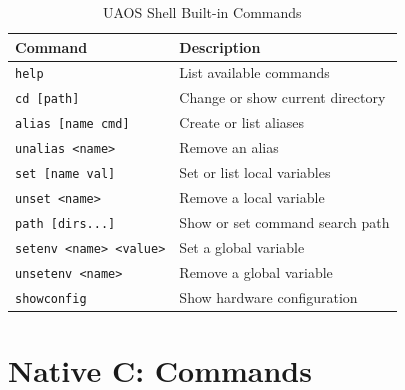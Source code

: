 \documentclass[11pt,a4paper]{report}
\begin{document}
\begin{table}[h]
    \centering
    \begin{tabular}{ll}
        \toprule
        \textbf{Command} & \textbf{Description} \\
        \midrule
        \texttt{help} & List available commands \\
        \texttt{cd [path]} & Change or show current directory \\
        \texttt{alias [name cmd]} & Create or list aliases \\
        \texttt{unalias <name>} & Remove an alias \\
        \texttt{set [name val]} & Set or list local variables \\
        \texttt{unset <name>} & Remove a local variable \\
        \texttt{path [dirs...]} & Show or set command search path \\
        \texttt{setenv <name> <value>} & Set a global variable \\
        \texttt{unsetenv <name>} & Remove a global variable \\
        \texttt{showconfig} & Show hardware configuration \\
        \bottomrule
    \end{tabular}
    \caption{UAOS Shell Built-in Commands}
    \label{tab:builtins}
\end{table}

\section{Native C: Commands}
\end{document}
